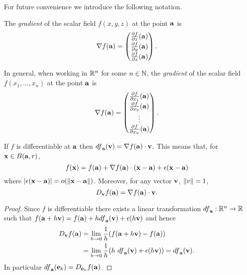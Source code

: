 For future convenience we introduce the following notation.
%
\begin{definition}[gradient]
    The \emph{gradient} of the scalar field \(f(x,y,z)\) at the point \(\aa\) is
    \[
        \nabla f(\aa) =
        \begin{pmatrix}
            \frac{\partial f}{\partial x}(\aa) \\[2pt]
            \frac{\partial f}{\partial y}(\aa) \\[2pt]
            \frac{\partial f}{\partial z}(\aa)
        \end{pmatrix}.
    \]
\end{definition}
%
\noindent
In general, when working in \(\bR^n\) for some \(n\in\bN\), the \emph{gradient} of the scalar field \(f(x_1,\ldots,x_n)\) at the point \(\aa\) is
\[
    \nabla f(\aa) =
    \begin{pmatrix}
        \frac{\partial f}{\partial x_1}(\aa) \\[2pt]
        \frac{\partial f}{\partial x_2}(\aa) \\[2pt]
        \vdots                               \\
        \frac{\partial f}{\partial x_n}(\aa)
    \end{pmatrix}.
\]


\begin{theorem}
    \label{thm:differential}
    If \(f\) is differentiable at \(\aa\)
    then \({df}_{\aa}(\vv) = \nabla f(\aa) \cdot \vv \).
    This means that, for \(\xx \in B(\aa,r)\),
    \[
        f(\xx) = f(\aa) +   \nabla f(\aa) \cdot (\xx-\aa) + \epsilon(\xx-\aa)
    \]
    where \(\abs{\epsilon(\xx-\aa)} = \littleo{\norm{\xx-\aa}}\).
    Moreover, for any vector \(\vv\), \(\norm{v}=1\),
    \[
        D_{\vv}f(\aa) = \nabla f(\aa) \cdot \vv.
    \]
\end{theorem}

\begin{proof}
    Since \(f\) is differentiable there exists a linear transformation \({df}_{\aa}: \bR^n \to \bR\) such that
    \(  f(\aa+ h \vv) = f(\aa) + h {df}_{\aa}(\vv) + \epsilon(h\vv)\)
    and hence
    \[
        \begin{aligned}
            D_{\vv}f(\aa) & =
            \lim_{h\to 0} \frac{1}{h}(f(\aa+h \vv) - f(\aa)) \\
                          & =
            \lim_{h\to 0} \frac{1}{h}(h \ {df}_{\aa}(\vv) + \epsilon(h\vv) )
            =  {df}_{\aa}(\vv).
        \end{aligned}
    \]
    In particular \({df}_{\aa}(\ee_k) = D_{\ee_k}f(\aa)\).
\end{proof}


